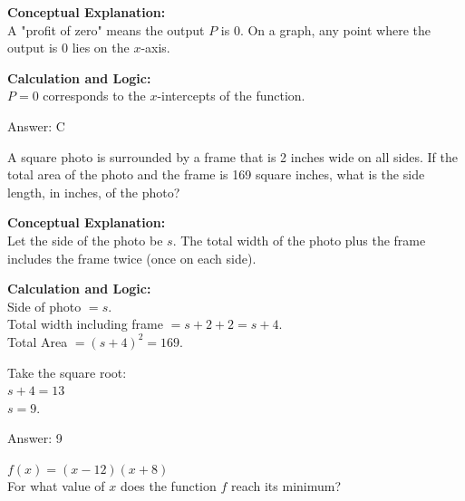 \documentclass[11pt,paper=a4,answers]{exam}
\begin{document}
\begin{questions}
\begin{solution}
\textbf{Conceptual Explanation:} \\
A "profit of zero" means the output $P$ is 0. On a graph, any point where the output is 0 lies on the $x$-axis.

\vspace{20pt}

\textbf{Calculation and Logic:} \\
$P = 0$ corresponds to the $x$-intercepts of the function.

\vspace{25pt}

Answer: \colorbox{yellow!100}{C}
\end{solution}

\vspace{40pt}

\question
A square photo is surrounded by a frame that is 2 inches wide on all sides. If the total area of the photo and the frame is 169 square inches, what is the side length, in inches, of the photo?

\begin{solution}
\textbf{Conceptual Explanation:} \\
Let the side of the photo be $s$. The total width of the photo plus the frame includes the frame twice (once on each side).

\vspace{20pt}

\textbf{Calculation and Logic:} \\
Side of photo $= s$. \\
Total width including frame $= s + 2 + 2 = s + 4$. \\
Total Area $= (s + 4)^2 = 169$.

\vspace{10pt}

Take the square root: \\
$s + 4 = 13$ \\
$s = 9$.

\vspace{25pt}

Answer: \colorbox{yellow!100}{9}
\end{solution}

\vspace{40pt}

\question
$f(x) = (x-12)(x+8)$ \\
For what value of $x$ does the function $f$ reach its minimum?


\end{questions}
\end{document}
